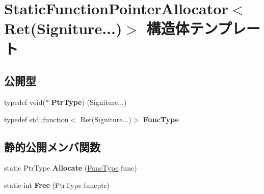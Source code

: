 \hypertarget{struct_static_function_pointer_allocator_3_01_ret_07_signiture_8_8_8_08_4}{}\section{Static\+Function\+Pointer\+Allocator$<$ Ret(Signiture...)$>$ 構造体テンプレート}
\label{struct_static_function_pointer_allocator_3_01_ret_07_signiture_8_8_8_08_4}
\subsection*{公開型}
\begin{DoxyCompactItemize}
\item 
typedef void($\ast$ {\bfseries Ptr\+Type}) (Signiture...)\hypertarget{struct_static_function_pointer_allocator_3_01_ret_07_signiture_8_8_8_08_4_ad94dac8a1b304a01446dc486bd5da5c0}{}\label{struct_static_function_pointer_allocator_3_01_ret_07_signiture_8_8_8_08_4_ad94dac8a1b304a01446dc486bd5da5c0}

\item 
typedef \hyperlink{classstd_1_1function}{std\+::function}$<$ Ret(Signiture...)$>$ {\bfseries Func\+Type}\hypertarget{struct_static_function_pointer_allocator_3_01_ret_07_signiture_8_8_8_08_4_a88ede1d2d39d8efba9ec673f1da9bea2}{}\label{struct_static_function_pointer_allocator_3_01_ret_07_signiture_8_8_8_08_4_a88ede1d2d39d8efba9ec673f1da9bea2}

\end{DoxyCompactItemize}
\subsection*{静的公開メンバ関数}
\begin{DoxyCompactItemize}
\item 
static Ptr\+Type {\bfseries Allocate} (\hyperlink{classstd_1_1function}{Func\+Type} func)\hypertarget{struct_static_function_pointer_allocator_3_01_ret_07_signiture_8_8_8_08_4_a0c8c597ee02b36092d3213cca975c135}{}\label{struct_static_function_pointer_allocator_3_01_ret_07_signiture_8_8_8_08_4_a0c8c597ee02b36092d3213cca975c135}

\item 
static int {\bfseries Free} (Ptr\+Type funcptr)\hypertarget{struct_static_function_pointer_allocator_3_01_ret_07_signiture_8_8_8_08_4_a54ef05dbad0f2a31aa3dd7ee89111087}{}\label{struct_static_function_pointer_allocator_3_01_ret_07_signiture_8_8_8_08_4_a54ef05dbad0f2a31aa3dd7ee89111087}

\end{DoxyCompactItemize}
